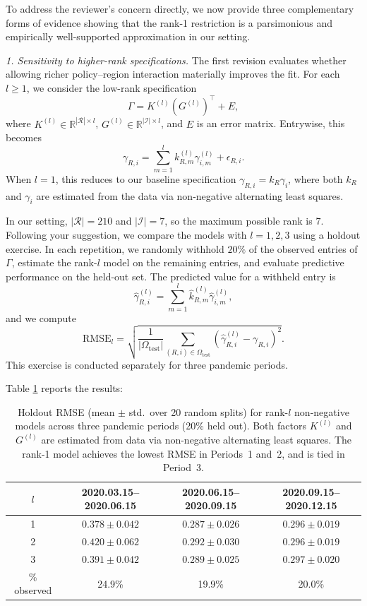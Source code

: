 \documentclass[letterpaper,twoside,11pt]{reviewresponse}
\begin{document}
\begin{enumerate}
	To address the reviewer's concern directly, we now provide three complementary forms of evidence showing that the rank-1 restriction is a parsimonious and empirically well-supported approximation in our setting.
	
	\textit{1. Sensitivity to higher-rank specifications.}  
	The first revision evaluates whether allowing richer policy--region interaction materially improves the fit. For each $l \geq 1$, we consider the low-rank specification
	\[
	\Gamma = K^{(l)}(G^{(l)})^\top + E,
	\]
	where $K^{(l)} \in \mathbb{R}^{|\mathcal{R}| \times l}$, $G^{(l)} \in \mathbb{R}^{|\mathcal{I}| \times l}$, and $E$ is an error matrix. Entrywise, this becomes
	\[
	\gamma_{R,i} = \sum_{m=1}^l k^{(l)}_{R,m} \gamma^{(l)}_{i,m} + \epsilon_{R,i}.
	\]
	When $l=1$, this reduces to our baseline specification $\gamma_{R,i}=k_R \gamma_i$, where both $k_R$ and $\gamma_i$ are estimated from the data via non-negative alternating least squares.
	
	In our setting, $|\mathcal{R}|=210$ and $|\mathcal{I}|=7$, so the maximum possible rank is $7$. Following your suggestion, we compare the models with $l=1,2,3$ using a holdout exercise. In each repetition, we randomly withhold $20\%$ of the observed entries of $\Gamma$, estimate the rank-$l$ model on the remaining entries, and evaluate predictive performance on the held-out set. The predicted value for a withheld entry is
	\[
	\hat{\gamma}_{R,i}^{(l)} = \sum_{m=1}^l \hat{k}^{(l)}_{R,m}\hat{\gamma}^{(l)}_{i,m},
	\]
	and we compute
	\[
	\mathrm{RMSE}_l
	=
	\sqrt{
	\frac{1}{|\Omega_{\mathrm{test}}|}
	\sum_{(R,i)\in\Omega_{\mathrm{test}}}
	\left(
	\hat{\gamma}_{R,i}^{(l)} - \gamma_{R,i}
	\right)^2
	}.
	\]
	This exercise is conducted separately for three pandemic periods.
	
	Table \ref{tab:low_rank} reports the results:
	\begin{table}[h!]
		\centering
		\begin{tabular}{|c|c|c|c|}
			\hline $l$ & 2020.03.15--2020.06.15 & 2020.06.15--2020.09.15 & 2020.09.15--2020.12.15\\\hline
			1 & $0.378 \pm 0.042$ & $0.287 \pm 0.026$ & $0.296 \pm 0.019$ \\
			2 & $0.420 \pm 0.062$ & $0.292 \pm 0.030$ & $0.296 \pm 0.019$ \\
			3 & $0.391 \pm 0.042$ & $0.289 \pm 0.025$ & $0.297 \pm 0.020$ \\\hline
			\% observed & 24.9\% & 19.9\% & 20.0\% \\\hline
		\end{tabular}
		\caption{Holdout RMSE (mean $\pm$ std.\ over 20 random splits) for rank-$l$ non-negative models across three pandemic periods (20\% held out). Both factors $K^{(l)}$ and $G^{(l)}$ are estimated from data via non-negative alternating least squares. The rank-1 model achieves the lowest RMSE in Periods~1 and~2, and is tied in Period~3.}
		\label{tab:low_rank}
	\end{table}
	

\end{enumerate}
\end{document}
